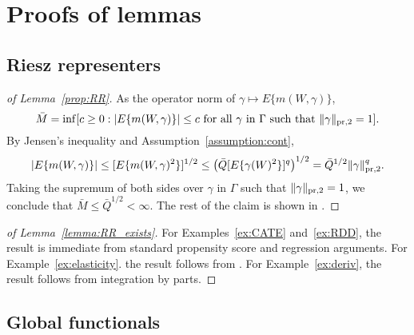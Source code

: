 \section{Proofs of lemmas}

\subsection{Riesz representers}

\begin{proof}[of Lemma~\ref{prop:RR}]
As the operator norm of $\gamma\mapsto E\{m(W,\gamma)\}$,
$$
\bar{M}=\inf [c\geq 0: |E\{m(W,\gamma)\}|\leq c  \text{ for all } \gamma \text{ in }\Gamma \text{ such that } \|\gamma\|_{\text{\normalfont pr,2}}=1].
$$
By Jensen's inequality and Assumption~\ref{assumption:cont},
$$
|E\{m(W,\gamma)\}| \leq [E \{m(W,\gamma)^2\}]^{1/2} \leq \left(\bar{Q} [E \{\gamma(W)^2\} ]^q\right)^{1/2} = \bar{Q}^{1/2} \|\gamma\|^q_{\text{\normalfont pr,2}}.
$$
Taking the supremum of both sides over $\gamma$ in $\Gamma$ such that $\|\gamma\|_{\text{\normalfont pr,2}}=1$, we conclude that $\bar{M}\leq \bar{Q}^{1/2}<\infty$. The rest of the claim is shown in \cite[Lemma 2.1]{chernozhukov2018global}.
\end{proof}

\begin{proof}[of Lemma~\ref{lemma:RR_exists}]
For Examples~\ref{ex:CATE} and~\ref{ex:RDD}, the result is immediate from standard propensity score and regression arguments. For Example~\ref{ex:elasticity}. the result follows from \cite[Proposition 3 and Example 5]{ichimura2021influence}. For Example~\ref{ex:deriv}, the result follows from integration by parts.
\end{proof}

\subsection{Global functionals}

